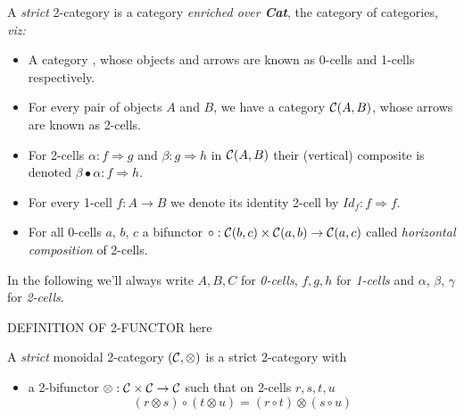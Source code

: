 \documentclass[a4paper]{article}
\begin{document}
\begin{definition}  \label{def:strict-two-cat}
A \emph{strict} 2-category \catC is a category \emph{enriched over
  \textbf{Cat}}, the category of categories, \emph{viz:}
\begin{itemize}
\item A category \catC, whose objects and arrows are known as
  0-cells and 1-cells respectively.
\item For every pair of objects $A$ and $B$, we have a
  category ${\cal C}(A, B)$, whose arrows are known as 2-cells.
\item For 2-cells $\alpha : f \Rightarrow g$ and $\beta : g
  \Rightarrow h$ in ${\cal C}(A,B)$ their (vertical) composite is denoted
  $\beta\bullet\alpha : f \Rightarrow h$.
\item For every 1-cell $f:A\to B$ we denote its identity 2-cell by
  $Id_f:f \Rightarrow f$.
\item For all 0-cells $a$, $b$, $c$ a bifunctor $\circ: {\cal C}(b, c)
  \times {\cal C}(a, b) \to {\cal C}(a, c)$ called \emph{horizontal
    composition} of 2-cells.
\end{itemize}
\end{definition}

\noindent
In the following we'll always write $A, B, C$ for \emph{0-cells}, $f,
g, h$ for \emph{1-cells} and $\alpha$, $\beta$, $\gamma$ for
\emph{2-cells}.

\begin{definition}
  \label{def:two-functor}
  DEFINITION OF 2-FUNCTOR here
\end{definition}


\begin{definition}\label{def:monoidal-two-cat}
A \emph{strict} monoidal 2-category $({\cal C}, \otimes)$ is a strict
2-category with
\begin{itemize}
\item a 2-bifunctor $\otimes: {\cal C} \times {\cal C} \to {\cal C}$ such that
  on 2-cells $r, s, t, u$
\[
(r \otimes s) \circ (t \otimes u) = (r \circ t) \otimes (s \circ u)
\]
\end{itemize}  
\end{definition}
\end{document}
